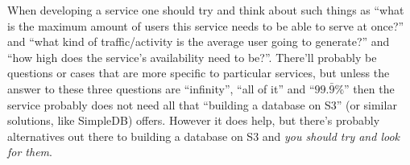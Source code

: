 \documentclass[11pt]{article}
\begin{document}
When developing a service one should try and think about such things as ``what is the maximum amount of users this service needs to be able to serve at once?'' and ``what kind of traffic/activity is the average user going to generate?'' and ``how high does the service's availability need to be?''.
There'll probably be questions or cases that are more specific to particular services, but unless the answer to these three questions are ``infinity'', ``all of it'' and ``$99.\bar{9}\%$'' then the service probably does not need all that ``building a database on S3'' (or similar solutions, like SimpleDB) offers.
However it does help, but there's probably alternatives out there to building a database on S3 and \textit{you should try and look for them}.
\end{document}
